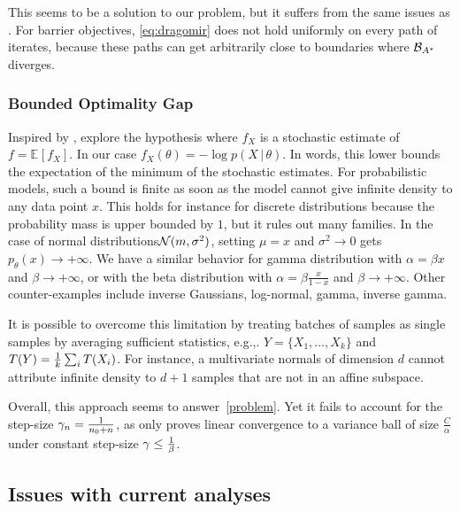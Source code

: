 \documentclass[twoside]{article}
\newcommand*{\expect}[2][]{\ensuremath{\mathbb{E}_{#1} \left[ #2 \right] }} %
\newcommand*{\expecti}[2][]{\ensuremath{\mathbb{E}_{#1} [ #2 ] }} %
\newcommand{\cond}{\,\vert\,}
\newcommand{\logpart}{A}
\newcommand{\bregmanconj}{\cB_{\logpart^*}}
\newcommand{\nat}{\theta}
\newcommand{\lr}{\gamma} %
\newcommand{\stgcvx}{\alpha} %
\newcommand{\smooth}{\beta} %
\begin{document}
This seems to be a solution to our problem, but it suffers from the same issues as \citet{hanzely2018fastest}.
For barrier objectives, \cref{eq:dragomir} does not hold uniformly on every path of iterates,
because these paths can get arbitrarily close to boundaries where $\bregmanconj$ diverges.

\subsubsection{Bounded Optimality Gap}
Inspired by \citet{loizou2021stochastic}, \citet{dorazio2021stochastic} explore the hypothesis
\alignn{
\min_\nat f(\nat) - \expect[X]{\min_\nat f_X(\nat)} \leq C,
\label{eq:dorazio}
}
where $f_X$ is a stochastic estimate of $f = \expecti{f_X}$. In our case $f_X(\nat) = - \log p(X\cond \nat)$.
In words, this lower bounds the expectation of the minimum of the stochastic estimates.
For probabilistic models, such a bound is finite as soon as the model cannot give infinite density to any data point $x$.
This holds for instance for discrete distributions because the probability mass is upper bounded by $1$,
but it rules out  many families.
In the case of normal distributions${\mathcal N}(m, \sigma^2)$, setting $\mu=x$ and $\sigma^2 \rightarrow 0$ gets $p_\nat (x) \rightarrow +\infty$. We have a similar behavior for gamma distribution with $\alpha = \beta x$ and $\beta \rightarrow +\infty$, or with the beta distribution with $\alpha=\beta \frac{x}{1-x}$ and $\beta \rightarrow +\infty$.
 Other counter-examples include inverse Gaussians, log-normal, gamma, inverse gamma.

It is possible to overcome this limitation by treating batches of samples as single samples by averaging sufficient statistics, e.g.,. $Y = \{X_1, \dots, X_k\}$ and $T(Y) = \frac{1}{k}\sum_i T(X_i)$.
For instance, a multivariate normals of dimension $d$ cannot attribute infinite density to $d+1$ samples that are not in an affine subspace.

Overall, this approach seems to answer~\eqref{problem}. Yet it fails to account for the step-size $\lr_n = \inv{n_0+n}$, as \citet[Thm.1]{dorazio2021stochastic} only proves linear convergence to a variance ball of size $\frac{C}{\stgcvx}$ under constant step-size $\lr \leq \inv{\smooth}$.

\subsection{Issues with current analyses}
\end{document}
